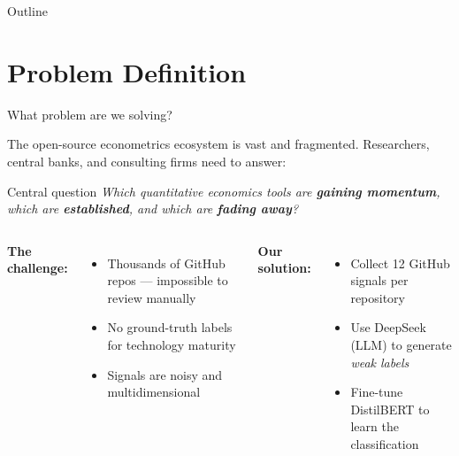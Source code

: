 {
  \begin{frame}[plain]
    \titlepage
  \end{frame}
}

{
  \begin{frame}{Outline}
    \tableofcontents
  \end{frame}
}

\section{Problem Definition}

\begin{frame}{What problem are we solving?}

  The open-source econometrics ecosystem is vast and fragmented.
  Researchers, central banks, and consulting firms need to answer:

  \bigskip
  \begin{block}{Central question}
    \centering
    \textit{Which quantitative economics tools are \textbf{gaining momentum},
    which are \textbf{established}, and which are \textbf{fading away}?}
  \end{block}

  \bigskip
  \begin{columns}
    \textbf{The challenge:}
    \begin{itemize}
      \item Thousands of GitHub repos — impossible to review manually
      \item No ground-truth labels for technology maturity
      \item Signals are noisy and multidimensional
    \end{itemize}

    \textbf{Our solution:}
    \begin{itemize}
      \item Collect 12 GitHub signals per repository
      \item Use DeepSeek (LLM) to generate \textit{weak labels}
      \item Fine-tune DistilBERT to learn the classification
    \end{itemize}
  \end{columns}

\end{frame}

